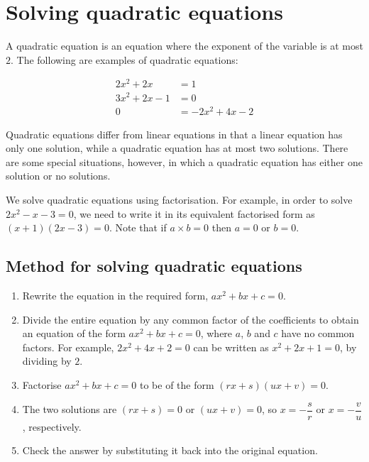 \section{Solving quadratic equations}

A quadratic equation is an equation where the exponent of the variable is at most
$2$. The following are examples of quadratic equations:

\begin{align*}
  2{x}^{2}+2x &= 1 \\
  3{x}^{2}+2x-1 &= 0 \\ 
  0 &= -2{x}^{2}+4x-2
\end{align*}

Quadratic equations differ from linear equations in that a linear
equation has only one solution, while a quadratic equation has at most
two solutions. There are some special situations, however, in which a
quadratic equation has either one solution or no solutions.


\par
We solve quadratic equations using factorisation. For example, in order
to solve $2{x}^{2}-x-3 = 0$, we need to write it in its equivalent
factorised form as $(x+1)(2x-3)=0$. Note that if $a \times b = 0$ then $a = 0$ or $b=0$.

\par
{}

\subsection*{Method for solving quadratic equations}
\begin{enumerate}[noitemsep, label=\textbf{\arabic*}. ] 
\item Rewrite the equation in the required form, $ax^{2} +bx +c =0$.
\item Divide the entire equation by any common factor of the coefficients
to obtain an equation of the form $a{x}^{2}+bx+c=0$, where $a$, $b$ and
$c$ have no common factors. For example, $2{x}^{2}+4x+2=0$ can be written as
${x}^{2}+2x+1=0$, by dividing by $2$.
\item Factorise $a{x}^{2}+bx+c=0$ to be of the form $(rx+s)(ux+v)=0$.
\item The two solutions are $(rx+s)=0$ or $(ux+v)=0$, so $x = -\dfrac{s}{r}$ or $x=-\dfrac{v}{u}$, respectively.
\item Check the answer by substituting it back into the original equation.
\end{enumerate}

